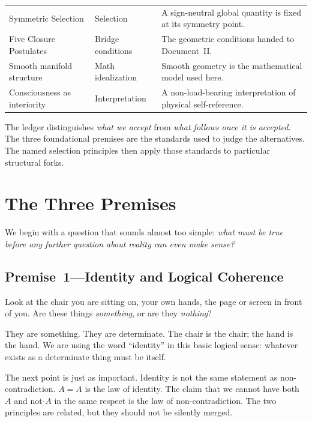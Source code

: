 \documentclass[11pt]{article}
\theoremstyle{canonstyle}
\begin{document}
\begin{center}
\begin{tabularx}{\textwidth}{@{}>{\raggedright\arraybackslash}p{4.8cm} >{\raggedright\arraybackslash}p{3.2cm} X@{}}
Symmetric Selection & Selection & A sign-neutral global quantity is fixed at its symmetry point. \\
Five Closure Postulates & Bridge conditions & The geometric conditions handed to Document~II. \\
Smooth manifold structure & Math idealization & Smooth geometry is the mathematical model used here. \\
Consciousness as interiority & Interpretation & A non-load-bearing interpretation of physical self-reference. \\
\bottomrule
\end{tabularx}
\end{center}

The ledger distinguishes \emph{what we accept} from \emph{what follows once it is accepted}. The three foundational premises are the standards used to judge the alternatives. The named selection principles then apply those standards to particular structural forks.

\newpage
\section{The Three Premises}

We begin with a question that sounds almost too simple: \emph{what must be true before any further question about reality can even make sense?}

\subsection{Premise~1---Identity and Logical Coherence}

\begin{reflect}
Look at the chair you are sitting on, your own hands, the page or screen in front of you. Are these things \emph{something}, or are they \emph{nothing}?
\end{reflect}

They are something. They are determinate. The chair is the chair; the hand is the hand. We are using the word ``identity'' in this basic logical sense: whatever exists as a determinate thing must be itself.

The next point is just as important. Identity is not the same statement as non-contradiction. $A=A$ is the law of identity. The claim that we cannot have both $A$ and not-$A$ in the same respect is the law of non-contradiction. The two principles are related, but they should not be silently merged.
\end{document}
